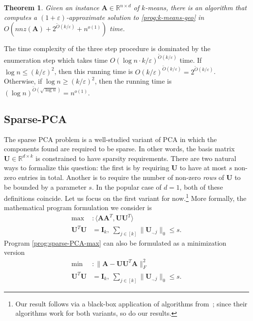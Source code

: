 \documentclass[11pt]{article}
\makeatletter
\theoremstyle{plain}
\newtheorem{theorem}{Theorem}[section]
\theoremstyle{plain}
\theoremstyle{definition}
\theoremstyle{plain}
\theoremstyle{remark}
\newenvironment{proof}[1][\protect\proofname]{\par
	\normalfont\topsep6\p@\@plus6\p@\relax
	\trivlist
	\itemindent\parindent
	\item[\hskip\labelsep\scshape #1]\ignorespaces
}{\endtrivlist\@endpefalse
}
\providecommand{\proofname}{Proof}
\newcommand{\RR}{\mathbb{R}}
\makeatother
\begin{document}
\begin{theorem}
    \label{thm:k-means-runtime}
    Given an instance $\bm{A}\in \RR^{n\times d}$ of $k$-means, there is an algorithm that computes a $(1+\varepsilon)$-approximate solution to \ref{prog:k-means-geo} in $O(nnz(\bm{A})+ 2^{\widetilde{O}(k/\varepsilon)}+n^{o(1)})$ time. 
\end{theorem}
\begin{proof}
    The time complexity of the three step procedure is dominated by the enumeration step which takes time $O(\log n \cdot k/\varepsilon)^{\widetilde{O}(k/\varepsilon)}$ time. If $\log n \leq (k/\varepsilon)^2$, then this running time is $O(k/\varepsilon)^{\widetilde{O}(k/\varepsilon)}=2^{\widetilde{O}(k/\varepsilon)}$. Otherwise, if $\log n \geq (k/\varepsilon)^2$, then the running time is $(\log n)^{\widetilde{O}(\sqrt{\log n})} =n^{o(1)}$. 
\end{proof}

\subsection{Sparse-PCA \cite{del2022sparse}}
The sparse PCA problem is a well-studied variant of PCA in which the components found are required to be sparse. In other words, the basis matrix $\bm{U}\in \RR^{d\times k}$ is constrained to have sparsity requirements. There are two natural ways to formalize this question: the first is by requiring $\bm{U}$ to have at most $s$ non-zero entries in total. Another is to require the number of non-zero {\em rows} of $\bm{U}$ to be bounded by a parameter $s$. In the popular case of $d=1$, both of these definitions coincide. Let us focus on the first variant for now.\footnote{Our result follows via a black-box application of algorithms from~\cite{del2022sparse}; since their algorithms work for both variants, so do our results.} More formally, the mathematical program formulation we consider is
\begin{align}
    \label{prog:sparse-PCA-max} \max&: \langle \bm{A}\bm{A}^T, \bm{U}\bm{U}^T \rangle \tag{sparse-PCA-max}\\
    \bm{U}^T\bm{U}&=\bm{I}_k, \; \sum_{j\in [k]}\|\bm{U}_{.,j}\|_0 \leq s.
\end{align}
Program \ref{prog:sparse-PCA-max} can also be formulated as a minimization version 
\begin{align}
    \label{prog:sparse-PCA-min} \min&: \|\bm{A}-\bm{U}\bm{U}^T\bm{A}\|_F^2 \tag{sparse-PCA-min}\\
    \bm{U}^T\bm{U}&=\bm{I}_k, \; \sum_{j\in [k]}\|\bm{U}_{.,j}\|_0 \leq s.
\end{align}
\end{document}
